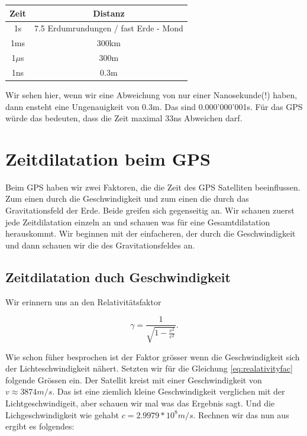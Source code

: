\begin{refsection}
\begin{center}
\begin{tabular}{| c | c |}
\hline
Zeit & Distanz \\
\hline
1s & 7.5 Erdumrundungen / fast Erde - Mond \\
\hline
1ms & 300km \\
\hline
1$\mu$s & 300m \\
\hline
1ns & 0.3m \\
\hline
\end{tabular}
\end{center}

\noindent{}Wir sehen hier, wenn wir eine Abweichung von nur einer Nanosekunde(!) haben, dann ensteht eine Ungenauigkeit von 0.3m. Das sind 0.000'000'001s. Für das GPS würde das bedeuten, dass die Zeit maximal 33ns Abweichen darf.

\section{Zeitdilatation beim GPS}
Beim GPS haben wir zwei Faktoren, die die Zeit des GPS Satelliten beeinflussen. Zum einen durch die Geschwindigkeit und zum einen die durch das Gravitationsfeld der Erde. Beide greifen sich gegenseitig an. Wir schauen zuerst jede Zeitdilatation einzeln an und schauen was für eine Gesamtdilatation herauskommt. Wir beginnen mit der einfacheren, der durch die Geschwindigkeit und dann schauen wir die des Gravitationsfeldes an.

\subsection{Zeitdilatation duch Geschwindigkeit}
Wir erinnern uns an den Relativitätsfaktor

\begin{equation}
\label{eq:realativityfac}
\gamma = \frac{1}{\sqrt{1 - \frac{v^2}{c^2}}}.
\end{equation}

\noindent{}Wie schon füher besprochen ist der Faktor grösser wenn die Geschwindigkeit sich der Lichteschwindigkeit nähert. Setzten wir für die Gleichung \ref{eq:realativityfac} folgende Grössen ein. Der Satellit kreist mit einer Geschwindigkeit von \(v \approx 3874 m/s \). Das ist eine ziemlich kleine Geschwindigkeit verglichen mit der Lichtgeschwindigeit, aber schauen wir mal was das Ergebnis sagt. Und die Lichgeschwindigkeit wie gehabt \(c = 2.9979 * 10^8 m/s\). 
Rechnen wir das nun aus ergibt es folgendes:\\


\end{refsection}
